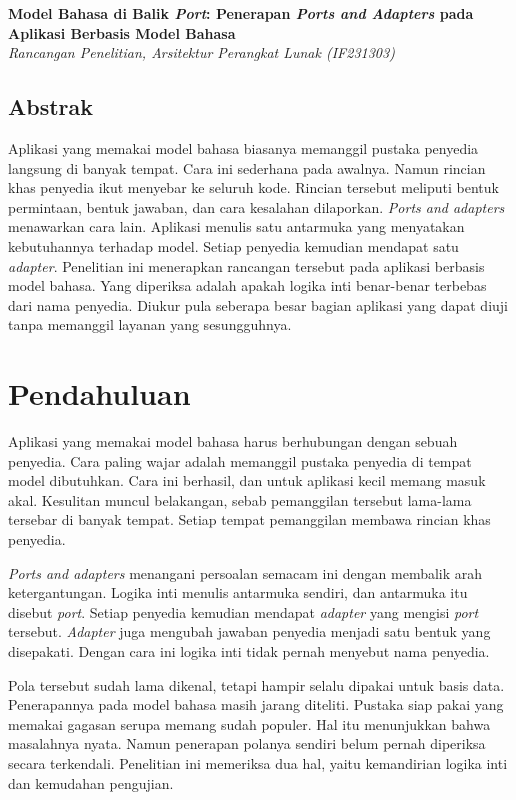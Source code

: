 \documentclass[11pt,a4paper]{article}
\begin{document}
\begin{center}
  {\LARGE\bfseries Model Bahasa di Balik \textit{Port}: Penerapan \textit{Ports and Adapters} pada Aplikasi Berbasis Model Bahasa}\\[0.6em]
  {\small\itshape Rancangan Penelitian, Arsitektur Perangkat Lunak (IF231303)}
\end{center}

\vspace{1em}

\subsection*{Abstrak}

Aplikasi yang memakai model bahasa biasanya memanggil pustaka penyedia langsung di banyak tempat. Cara ini sederhana pada awalnya. Namun rincian khas penyedia ikut menyebar ke seluruh kode. Rincian tersebut meliputi bentuk permintaan, bentuk jawaban, dan cara kesalahan dilaporkan. \textit{Ports and adapters} menawarkan cara lain. Aplikasi menulis satu antarmuka yang menyatakan kebutuhannya terhadap model. Setiap penyedia kemudian mendapat satu \textit{adapter}. Penelitian ini menerapkan rancangan tersebut pada aplikasi berbasis model bahasa. Yang diperiksa adalah apakah logika inti benar-benar terbebas dari nama penyedia. Diukur pula seberapa besar bagian aplikasi yang dapat diuji tanpa memanggil layanan yang sesungguhnya.

\section{Pendahuluan}

Aplikasi yang memakai model bahasa harus berhubungan dengan sebuah penyedia. Cara paling wajar adalah memanggil pustaka penyedia di tempat model dibutuhkan. Cara ini berhasil, dan untuk aplikasi kecil memang masuk akal. Kesulitan muncul belakangan, sebab pemanggilan tersebut lama-lama tersebar di banyak tempat. Setiap tempat pemanggilan membawa rincian khas penyedia.

\textit{Ports and adapters} menangani persoalan semacam ini dengan membalik arah ketergantungan. Logika inti menulis antarmuka sendiri, dan antarmuka itu disebut \textit{port}. Setiap penyedia kemudian mendapat \textit{adapter} yang mengisi \textit{port} tersebut. \textit{Adapter} juga mengubah jawaban penyedia menjadi satu bentuk yang disepakati. Dengan cara ini logika inti tidak pernah menyebut nama penyedia.

Pola tersebut sudah lama dikenal, tetapi hampir selalu dipakai untuk basis data. Penerapannya pada model bahasa masih jarang diteliti. Pustaka siap pakai yang memakai gagasan serupa memang sudah populer. Hal itu menunjukkan bahwa masalahnya nyata. Namun penerapan polanya sendiri belum pernah diperiksa secara terkendali. Penelitian ini memeriksa dua hal, yaitu kemandirian logika inti dan kemudahan pengujian.
\end{document}
